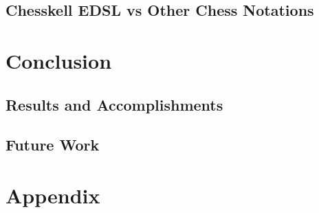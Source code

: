 \documentclass[12pt, a4paper, bibliography=totocnumbered]{scrreprt}
\begin{document}
\chapter{Chesskell EDSL vs Other Chess Notations}


\part{Conclusion}

\chapter{Results and Accomplishments}

\chapter{Future Work}


\part{Appendix}






\end{document}
